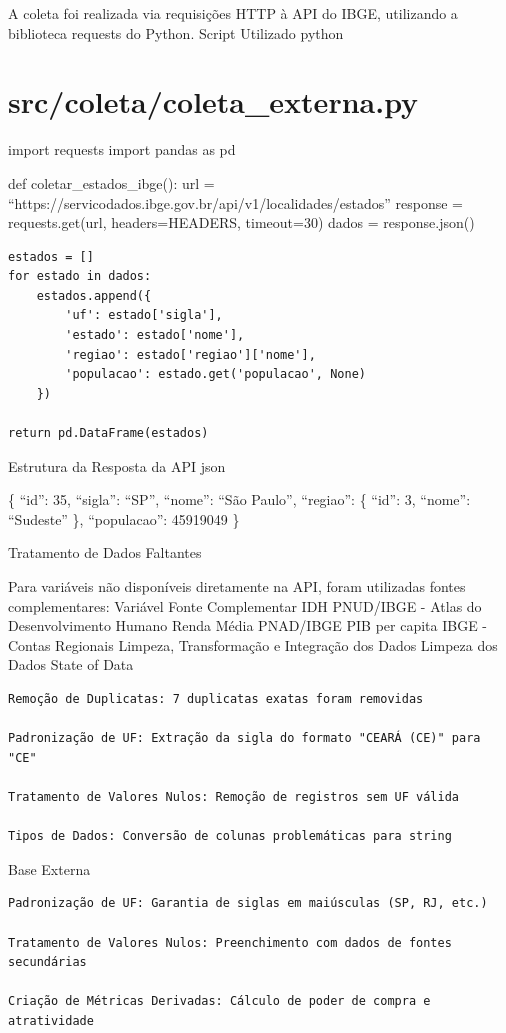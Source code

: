 \documentclass[
  11pt,
  letterpaper,
  DIV=11,
  numbers=noendperiod]{scrartcl}
\begin{document}
A coleta foi realizada via requisições HTTP à API do IBGE, utilizando a
biblioteca requests do Python. Script Utilizado python

\section{src/coleta/coleta\_externa.py}\label{srccoletacoleta_externa.py}

import requests import pandas as pd

def coletar\_estados\_ibge(): url =
``https://servicodados.ibge.gov.br/api/v1/localidades/estados'' response
= requests.get(url, headers=HEADERS, timeout=30) dados = response.json()

\begin{verbatim}
estados = []
for estado in dados:
    estados.append({
        'uf': estado['sigla'],
        'estado': estado['nome'],
        'regiao': estado['regiao']['nome'],
        'populacao': estado.get('populacao', None)
    })

return pd.DataFrame(estados)
\end{verbatim}

Estrutura da Resposta da API json

\{ ``id'': 35, ``sigla'': ``SP'', ``nome'': ``São Paulo'', ``regiao'':
\{ ``id'': 3, ``nome'': ``Sudeste'' \}, ``populacao'': 45919049 \}

Tratamento de Dados Faltantes

Para variáveis não disponíveis diretamente na API, foram utilizadas
fontes complementares: Variável Fonte Complementar IDH PNUD/IBGE - Atlas
do Desenvolvimento Humano Renda Média PNAD/IBGE PIB per capita IBGE -
Contas Regionais Limpeza, Transformação e Integração dos Dados Limpeza
dos Dados State of Data

\begin{verbatim}
Remoção de Duplicatas: 7 duplicatas exatas foram removidas

Padronização de UF: Extração da sigla do formato "CEARÁ (CE)" para "CE"

Tratamento de Valores Nulos: Remoção de registros sem UF válida

Tipos de Dados: Conversão de colunas problemáticas para string
\end{verbatim}

Base Externa

\begin{verbatim}
Padronização de UF: Garantia de siglas em maiúsculas (SP, RJ, etc.)

Tratamento de Valores Nulos: Preenchimento com dados de fontes secundárias

Criação de Métricas Derivadas: Cálculo de poder de compra e atratividade
\end{verbatim}
\end{document}
